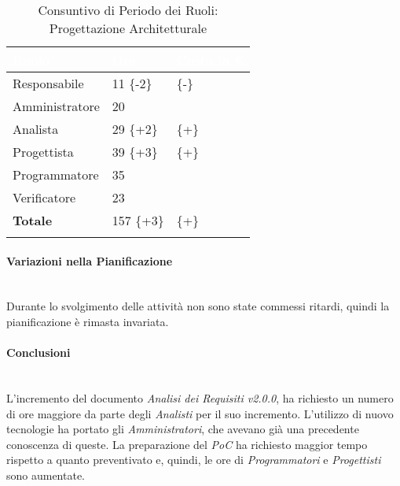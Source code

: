 \begin{longtable}{| C{.30\textwidth}| C{.15\textwidth}| C{.20\textwidth}|}
\hline
{}\textbf{\textcolor{white}{Ruolo}} & \textbf{\textcolor{white}{Ore}} & \textbf{\textcolor{white}{Costo in \euro}} \\
\hline 
Responsabile & 11 \{-2\}&  \{-\} \\
\hline
{}Amministratore & 20 &  \\
\hline
Analista & 29 \{+2\} &  \{+\}\\
\hline
{}Progettista & 39 \{+3\} &  \{+\}\\
\hline
Programmatore & 35 &  \\
\hline
{}Verificatore & 23 & \\
\hline
\textbf{Totale} & 157 \{+3\} &  \{+\}\\ 
\hline

\caption{Consuntivo di Periodo dei Ruoli: Progettazione Architetturale}
\label{Distribuzione oraria per ruoli del periodo di pa}
\end{longtable}

\paragraph{Variazioni nella Pianificazione} ~\\
Durante lo svolgimento delle attività non sono state commessi ritardi, quindi la pianificazione è rimasta invariata. \\

\paragraph{Conclusioni} ~\\
L'incremento del documento \textit{Analisi dei Requisiti v2.0.0}, ha richiesto un numero di ore maggiore da parte degli \textit{Analisti} per il suo incremento. L'utilizzo di nuovo tecnologie ha portato gli \textit{Amministratori}, che avevano già una precedente conoscenza di queste. La preparazione del \textit{PoC} ha richiesto maggior tempo rispetto a quanto preventivato e, quindi, le ore di \textit{Programmatori} e \textit{Progettisti} sono aumentate. 